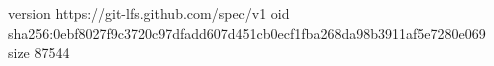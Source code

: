 version https://git-lfs.github.com/spec/v1
oid sha256:0ebf8027f9c3720c97dfadd607d451cb0ecf1fba268da98b3911af5e7280e069
size 87544
